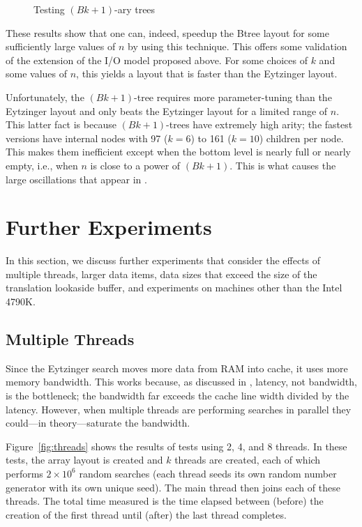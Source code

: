 \documentclass{patmorin}
\begin{document}
\begin{figure}
   \caption{Testing $(Bk+1)$-ary trees}
\end{figure}

These results show that one can, indeed, speedup the Btree layout for
some sufficiently large values of $n$ by using this technique.  This offers
some validation of the extension of the I/O model proposed above.
For some choices of $k$ and some values of $n$, this yields a layout
that is faster than the Eytzinger layout. 

Unfortunately, the $(Bk+1)$-tree requires more parameter-tuning than the
Eytzinger layout and only beats the Eytzinger layout for a limited range
of $n$.  This latter fact is because $(Bk+1)$-trees have extremely high
arity; the fastest versions have internal nodes with 97 ($k=6$) to 161
($k=10$) children per node. This makes them inefficient except when the
bottom level is nearly full or nearly empty, i.e., when $n$ is close to
a power of $(Bk+1)$.  This is what causes the large oscillations that
appear in .

\section{Further Experiments}

In this section, we discuss further experiments that consider the effects
of multiple threads, larger data items, data sizes that exceed the size
of the translation lookaside buffer, and experiments on machines other
than the Intel 4790K.

\subsection{Multiple Threads}

Since the Eytzinger search moves more data from RAM into cache,
it uses more memory bandwidth.  This works because, as discussed in
, latency, not bandwidth, is the bottleneck; the
bandwidth far exceeds the cache line width divided by the latency.
However, when multiple threads are performing searches in parallel they
could---in theory---saturate the bandwidth.

Figure~\ref{fig:threads} shows the results of tests
using 2, 4, and 8 threads.  In these tests, the array layout is created
and $k$ threads are created, each of which performs $2\times 10^6$
random searches (each thread seeds its own random number generator
with its own unique seed).  The main thread then joins each of these
threads. The total time measured is the time elapsed between (before)
the creation of the first thread until (after) the last thread completes.
\end{document}
